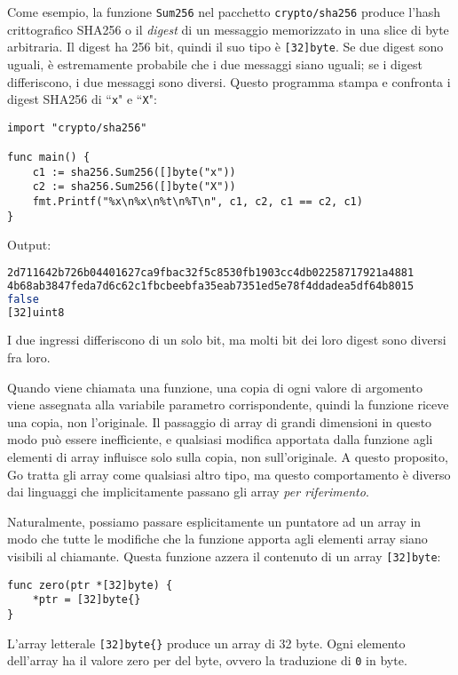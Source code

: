 \documentclass[../../thesis.tex]{subfiles}
\begin{document}
    Come esempio, la funzione \verb"Sum256" nel pacchetto \verb"crypto/sha256" produce l'hash crittografico SHA256 o il \textit{digest} di un messaggio memorizzato in una slice di byte arbitraria.
    Il digest ha 256 bit, quindi il suo tipo è \verb"[32]byte".
    Se due digest sono uguali, è estremamente probabile che i due messaggi siano uguali;
    se i digest differiscono, i due messaggi sono diversi.
    Questo programma stampa e confronta i digest SHA256 di ``\verb"x"" e ``\verb"X"":
    \begin{lstlisting}[frame = single, label = {lst:lstlisting3-1.9}]
import "crypto/sha256"

func main() {
    c1 := sha256.Sum256([]byte("x"))
    c2 := sha256.Sum256([]byte("X"))
    fmt.Printf("%x\n%x\n%t\n%T\n", c1, c2, c1 == c2, c1)
}
    \end{lstlisting}
    Output:
    \begin{lstlisting}[language = bash, frame = L, label = {lst:lstlisting3-1.10}]
2d711642b726b04401627ca9fbac32f5c8530fb1903cc4db02258717921a4881
4b68ab3847feda7d6c62c1fbcbeebfa35eab7351ed5e78f4ddadea5df64b8015
false
[32]uint8
    \end{lstlisting}
    I due ingressi differiscono di un solo bit, ma molti bit dei loro digest sono diversi fra loro.
    \hfill \vspace{12pt}

    Quando viene chiamata una funzione, una copia di ogni valore di argomento viene assegnata alla variabile parametro corrispondente, quindi la funzione riceve una copia, non l'originale.
    Il passaggio di array di grandi dimensioni in questo modo può essere inefficiente, e qualsiasi modifica apportata dalla funzione agli elementi di array influisce solo sulla copia, non sull'originale.
    A questo proposito, Go tratta gli array come qualsiasi altro tipo, ma questo comportamento è diverso dai linguaggi che implicitamente passano gli array \textit{per riferimento}.
    \hfill \vspace{12pt}

    Naturalmente, possiamo passare esplicitamente un puntatore ad un array in modo che tutte le modifiche che la funzione apporta agli elementi array siano visibili al chiamante.
    Questa funzione azzera il contenuto di un array \verb"[32]byte":
    \begin{lstlisting}[frame = single, label = {lst:lstlisting3-1.11}]
func zero(ptr *[32]byte) {
    *ptr = [32]byte{}
}
    \end{lstlisting}
    L'array letterale \verb"[32]byte{}" produce un array di 32 byte.
    Ogni elemento dell'array ha il valore zero per del byte, ovvero la traduzione di \verb"0" in byte.
    \hfill \vspace{12pt}
\end{document}
